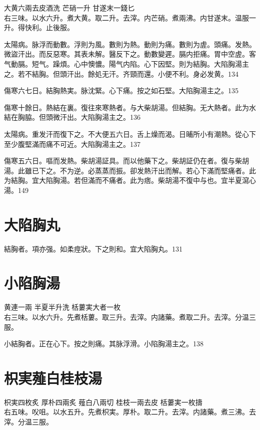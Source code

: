 大黄{\scriptsize 六兩去皮酒洗} 芒硝{\scriptsize 一升} 甘遂末{\scriptsize 一錢匕}\\
右三味。以水六升。煮大黄。取二升。去滓。内芒硝。煮兩沸。内甘遂末。温服一升。得快利。止後服。

太陽病。脉浮而動數。浮則为風。數則为熱。動則为痛。數則为虗。頭痛。发熱。微盜汗出。而反惡寒。其表未解。醫反下之。動數變遲。膈内拒痛。胃中空虗。客气動膈。短气。躁煩。心中懊憹。陽气内陷。心下因堅。則为結胸。大陷胸湯主之。若不結胸。但頭汗出。餘処无汗。齐頸而還。小便不利。身必发黄。134

傷寒六七日。結胸熱実。脉沈緊。心下痛。按之如石堅。大陷胸湯主之。135

傷寒十餘日。熱結在裏。復往來寒熱者。与大柴胡湯。但結胸。无大熱者。此为水結在胸脇。{\khaaitp 但}頭微汗出。大陷胸湯主之。136

太陽病。重发汗而復下之。不大便五六日。舌上燥而渴。日晡所小有潮熱。從心下至少腹堅滿而痛不可近。大陷胸湯主之。137

傷寒五六日。嘔而发熱。柴胡湯証具。而以他藥下之。柴胡証仍在者。復与柴胡湯。此雖已下之。不为逆。必蒸蒸而振。卻发熱汗出而解。若心下滿而堅痛者。此为結胸。宜大陷胸湯。若但滿而不痛者。此为痞。柴胡{\khaaitp 湯}不復中与也。宜半夏瀉心湯。149

\section{大陷胸丸}

結胸者。項亦强。如柔痙狀。下之則和。宜大陷胸丸。131

\section{小陷胸湯}

黄連{\scriptsize 一兩} 半夏{\scriptsize 半升洗} 栝蔞実{\scriptsize 大者一枚}\\
右三味。以水六升。先煮栝蔞。取三升。去滓。内諸藥。煮取二升。去滓。分温三服。

小結胸者。正在心下。按之則痛。其脉浮滑。小陷胸湯主之。138

\section{枳実薤白桂枝湯}

枳実{\scriptsize 四枚炙} 厚朴{\scriptsize 四兩炙} 薤白{\scriptsize 八兩切} 桂枝{\scriptsize 一兩去皮} 栝蔞実{\scriptsize 一枚擣}\\
右五味。㕮咀。以水五升。先煮枳実。厚朴。取二升。去滓。内諸藥。煮三沸。去滓。分温三服。

